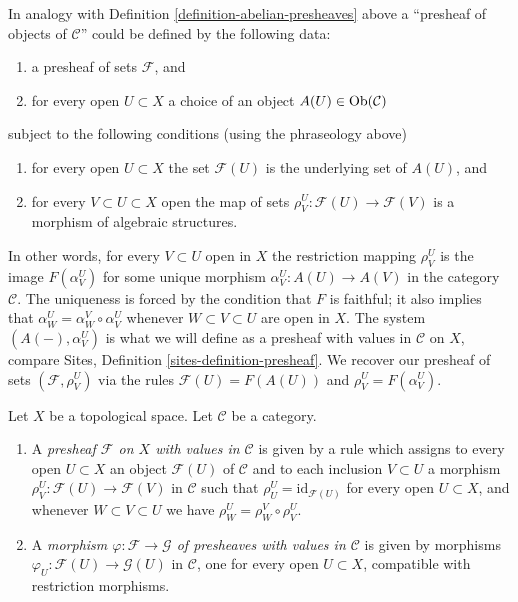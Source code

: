\medskip\noindent
In analogy with Definition \ref{definition-abelian-presheaves}
above a ``presheaf of objects of $\mathcal{C}$'' could be
defined by the following data:
\begin{enumerate}
\item a presheaf of sets $\mathcal{F}$, and
\item for every open $U \subset X$ a choice
of an object $A(U) \in \mathop{\mathrm{Ob}}\nolimits(\mathcal{C})$
\end{enumerate}
subject to the following conditions (using the phraseology above)
\begin{enumerate}
\item for every open $U \subset X$ the set $\mathcal{F}(U)$
is the underlying set of $A(U)$, and
\item for every $V \subset U \subset X$ open
the map of sets $\rho_V^U: \mathcal{F}(U) \to \mathcal{F}(V)$
is a morphism of algebraic structures.
\end{enumerate}
In other words, for every $V \subset U$ open in $X$
the restriction mapping $\rho^U_V$ is the image
$F(\alpha^U_V)$ for some unique morphism
$\alpha^U_V : A(U) \to A(V)$ in the category $\mathcal{C}$.
The uniqueness is forced by the condition that $F$ is
faithful; it also implies that
$\alpha^U_W = \alpha^V_W \circ \alpha^U_V$
whenever $W \subset V \subset U$ are open in $X$.
The system $(A(-), \alpha^U_V)$ is what we will define as a
presheaf with values in $\mathcal{C}$ on $X$, compare
Sites, Definition \ref{sites-definition-presheaf}.
We recover our presheaf of sets $(\mathcal{F}, \rho_V^U)$
via the rules $\mathcal{F}(U) = F(A(U))$ and
$\rho_V^U = F(\alpha_V^U)$.

\begin{definition}
\label{definition-presheaf-values-in-category}
Let $X$ be a topological space.
Let $\mathcal{C}$ be a category.
\begin{enumerate}
\item A {\it presheaf $\mathcal{F}$ on $X$ with values in $\mathcal{C}$}
is given by a rule which assigns to every open $U \subset X$
an object $\mathcal{F}(U)$ of $\mathcal{C}$
and to each inclusion $V \subset U$
a morphism $\rho_V^U : \mathcal{F}(U) \to \mathcal{F}(V)$
in $\mathcal{C}$ such that $\rho_U^U = \text{id}_{\mathcal{F}(U)}$ for every open $U \subset X$, and whenever $W \subset V \subset U$
we have $\rho_W^U = \rho_W^V \circ \rho_V^U$.
\item A {\it morphism $\varphi : \mathcal{F} \to \mathcal{G}$
of presheaves with values in $\mathcal{C}$} is given by
morphisms $\varphi_U : \mathcal{F}(U) \to \mathcal{G}(U)$
in $\mathcal{C}$, one for every open $U \subset X$, compatible with
restriction morphisms.
\end{enumerate}
\end{definition}

